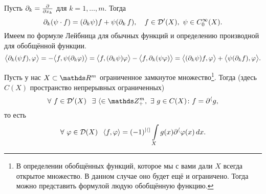 \begin{Ut}
  Пусть $\partial_k = \frac{\partial  }{\partial x_k}$ для $k=1,\dots,m$. Тогда
\[
  \partial_k(\psi\cdot f) = (\partial_k\psi)f+\psi(\partial_k\,f),\quad f\in \mathcal D'(X),\ \psi\in C_0^\infty(X).
\]
  Имеем по формуле Лейбница для обычных функций и определению производной для обобщённой функции.
\[
  \big\langle \partial_k(\psi f),\varphi\big\rangle = -\big\langle f,\psi(\partial_k\varphi)\big\rangle = 
  \big\langle f,(\partial_k\psi)\varphi\big\rangle - \big\langle f,\partial_k(\psi\varphi)\big\rangle = 
  \big\langle(\partial_k\psi)f,\varphi\big\rangle + \big\langle\psi(\partial_kf),\varphi\big\rangle.
\]
\end{Ut}

\begin{The}
  Пусть у нас $X\subset \R^m$ ограниченное замкнутое множество\footnote{В определении обобщённых функций, которое мы с вами дали $X$ всегда открытое множество. В данном случае оно будет ещё и ограничено. Тогда можно представить формулой людую обобщённую функцию.}.
Тогда (здесь $C(X)$ пространство непрерывных ограниченных)
\[
  \forall\ f\in\D'(X)\pau \exists\ \a\in\Z_+^m,\ \exists\ g\in C(X)\colon f = \dl^\a g,
\]
то есть 
\[
  \forall\ \varphi\in\mathcal D(X)\hskip .75em plus.1em minus.08em\relax
  \langle f,\varphi\rangle = (-1)^{|\langle|}\int\limits_{X}g(x)\partial^\langle\varphi(x)\,dx.
\]
\end{The}
